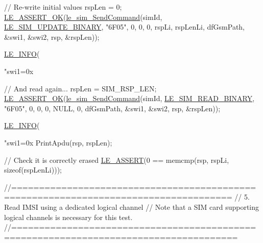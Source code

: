 \begin{DoxyCodeInclude}
{{{{{{    \textcolor{comment}{// Re-write initial values}
    rspLen = 0;
    \hyperlink{le__log_8h_a7cd2daa3d4af1de4d29e0eed95187484}{LE\_ASSERT\_OK}(\hyperlink{le__sim__interface_8h_a8bbaea044b44f8b0ebff67bf98de816a}{le\_sim\_SendCommand}(simId,
                                    \hyperlink{le__sim__interface_8h_ac1a708ba305c36e33383073ec7f0e331a68f83c3e207642ec4153b67c51cd3cd6}{LE\_SIM\_UPDATE\_BINARY},
                                    \textcolor{stringliteral}{"6F05"},
                                    0,
                                    0,
                                    0,
                                    rspLi,
                                    rspLenLi,
                                    dfGsmPath,
                                    &swi1,
                                    &swi2,
                                    rsp,
                                    &rspLen));

    \hyperlink{le__log_8h_a23e6d206faa64f612045d688cdde5808}{LE\_INFO}(\textcolor{stringliteral}{"swi1=0x%

    \textcolor{comment}{// And read again...}
    rspLen = SIM\_RSP\_LEN;
    \hyperlink{le__log_8h_a7cd2daa3d4af1de4d29e0eed95187484}{LE\_ASSERT\_OK}(\hyperlink{le__sim__interface_8h_a8bbaea044b44f8b0ebff67bf98de816a}{le\_sim\_SendCommand}(simId,
                                    \hyperlink{le__sim__interface_8h_ac1a708ba305c36e33383073ec7f0e331ae4a619ba58f2cd503103b397b717b16f}{LE\_SIM\_READ\_BINARY},
                                    \textcolor{stringliteral}{"6F05"},
                                    0,
                                    0,
                                    0,
                                    NULL,
                                    0,
                                    dfGsmPath,
                                    &swi1,
                                    &swi2,
                                    rsp,
                                    &rspLen));

    \hyperlink{le__log_8h_a23e6d206faa64f612045d688cdde5808}{LE\_INFO}(\textcolor{stringliteral}{"swi1=0x%
    PrintApdu(rsp, rspLen);

    \textcolor{comment}{// Check it is correctly erased}
    \hyperlink{le__log_8h_ac0dbbef91dc0fed449d0092ff0557b39}{LE\_ASSERT}(0 == memcmp(rsp, rspLi, \textcolor{keyword}{sizeof}(rspLenLi)));

    \textcolor{comment}{//=====================================================================================}
    \textcolor{comment}{// 5. Read IMSI using a dedicated logical channel}
    \textcolor{comment}{// Note that a SIM card supporting logical channels is necessary for this test.}
    \textcolor{comment}{//======================================================================================}

}}}}}}}}
\end{DoxyCodeInclude}
